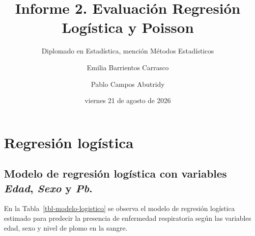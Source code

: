 \documentclass[
  english,
  10pt,
  letterpaper,
  DIV=11,
  numbers=noendperiod]{scrartcl}
\title{Informe 2. Evaluación Regresión Logística y Poisson}
\subtitle{Diplomado en Estadística, mención Métodos Estadísticos}
\author{Emilia Barrientos Carrasco \and Pablo Campos Abutridy}
\date{viernes 21 de agosto de 2026}
\begin{document}
\maketitle


\section{Regresión logística}\label{regresiuxf3n-loguxedstica}

\subsection{\texorpdfstring{Modelo de regresión logística con variables
\emph{Edad}, \emph{Sexo} y
\emph{Pb}.}{Modelo de regresión logística con variables Edad, Sexo y Pb.}}\label{modelo-de-regresiuxf3n-loguxedstica-con-variables-edad-sexo-y-pb.}

En la Tabla~\ref{tbl-modelo-logistico} se observa el modelo de regresión
logística estimado para predecir la presencia de enfermedad respiratoria
según las variables edad, sexo y nivel de plomo en la sangre.

\begin{table}[H]

\caption{\label{tbl-modelo-logistico}Presencia de problemas
respiratorios según edad, sexo y nivel de plomo en la sangre (μg/dL)}


\end{table}%
\end{document}
